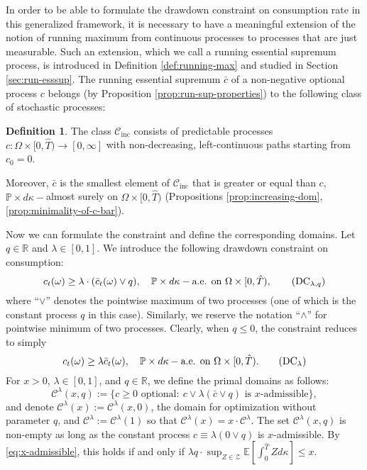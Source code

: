 \documentclass[11pt, oneside]{article}   	%
\theoremstyle{plain}
\theoremstyle{definition}
\newtheorem{defn}[thm]{Definition}
\theoremstyle{remark}
\begin{document}
In order to be able to formulate the drawdown constraint on consumption rate in this generalized framework, it is necessary to have a meaningful extension of the notion of running maximum from continuous processes to processes that are just measurable. Such an extension, which we call a running essential supremum process, is introduced in Definition \ref{def:running-max} and studied in Section \ref{sec:run-esssup}. The running essential supremum $\bar{c}$ of a non-negative optional process $c$ belongs (by Proposition \ref{prop:run-sup-properties}) to the following class of stochastic processes:
\begin{defn}\label{def:C-0-class}
The class $\mathcal{C}_{\text{inc}}$ consists of predictable processes $c:\Omega\times[0,\hat{T})\to[0,\infty]$ with non-decreasing, left-continuous paths starting from $c_0=0$.
\end{defn}
Moreover, $\bar{c}$ is the smallest element of $\mathcal{C}_{\text{inc}}$ that is greater or equal than $c$, $\mathbb{P}\times d\kappa-$almost surely on $\Omega\times[0,\hat{T})$ (Propositions \ref{prop:increasing-dom}, \ref{prop:minimality-of-c-bar}).

Now we can formulate the constraint and define the corresponding domains. Let $q\in\mathbb{R}$ and $\lambda\in[0,1]$. We introduce the following drawdown constraint on consumption:
\begin{equation}\label{cond:ddc-with-q}
c_t(\omega)\geq \lambda\cdot(\bar{c}_t(\omega)\vee q),\quad \mathbb{P}\times d\kappa-\text{a.e. on }\Omega\times[0,\hat{T}),\tag{DC$_{\lambda,q}$}
\end{equation}
where ``$\vee$'' denotes the pointwise maximum of two processes (one of which is the constant process $q$ in this case). Similarly, we reserve the notation ``$\wedge$'' for pointwise minimum of two processes. Clearly, when $q\leq 0$, the constraint \label{def:ddc-with-q} reduces to simply
\begin{equation}\label{cond:ddc}
c_t(\omega)\geq \lambda\bar{c}_t(\omega),\quad \mathbb{P}\times d\kappa-\text{a.e. on }\Omega\times[0,\hat{T}).\tag{DC$_{\lambda}$}
\end{equation}
For $x>0$, $\lambda\in[0,1]$, and $q\in\mathbb{R}$, we define the primal domains as follows:
\begin{equation}\label{def:primal-dom}
\mathcal{C}^\lambda(x,q):=\{c\geq 0\text{ optional}:\ c\vee \lambda(\bar{c}\vee q) \text{ is } x\text{-admissible} \},
\end{equation}
and denote $\mathcal{C}^\lambda(x):=\mathcal{C}^\lambda(x,0)$, the domain for optimization without parameter $q$, and $\mathcal{C}^\lambda:=\mathcal{C}^\lambda(1)$ so that $\mathcal{C}^\lambda(x)=x\cdot\mathcal{C}^\lambda$. The set $\mathcal{C}^\lambda(x,q)$ is non-empty as long as the constant process $c\equiv\lambda(0\vee q)$ is $x$-admissible. By \eqref{eq:x-admissible}, this holds if and only if $\lambda q\cdot\sup_{Z\in\mathcal{Z}}\mathbb{E}\left[\int_0^{\hat{T}}Zd\kappa\right]\leq x$.
\end{document}
